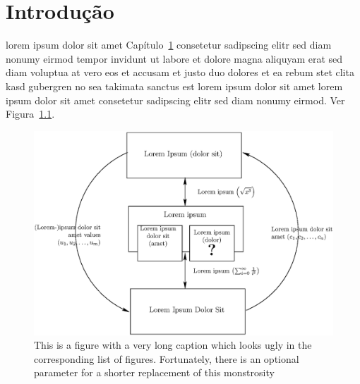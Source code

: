 \chapter{Introdução}
\label{chap:intro}

%
%
%
%
%
%
%
%
lorem ipsum dolor sit amet Capítulo~\ref{chap:intro} consetetur
sadipscing elitr sed diam nonumy eirmod tempor invidunt ut labore
et dolore magna aliquyam erat sed diam voluptua at vero eos et
accusam et justo duo dolores et ea rebum stet clita kasd gubergren
no sea takimata sanctus est lorem ipsum dolor sit amet lorem ipsum
dolor sit amet consetetur sadipscing elitr sed diam nonumy eirmod.
Ver Figura~\ref{fig:fig1}.

\begin{figure}[htb!]
\centering\includegraphics[width=.65\textwidth]{document/figures/exemplo.eps}
\caption%
        {\label{fig:fig1}This is a figure with a very long
    caption which looks ugly in the corresponding list of figures.
    Fortunately, there is an optional parameter for a shorter
    replacement of this monstrosity}%
\end{figure}

